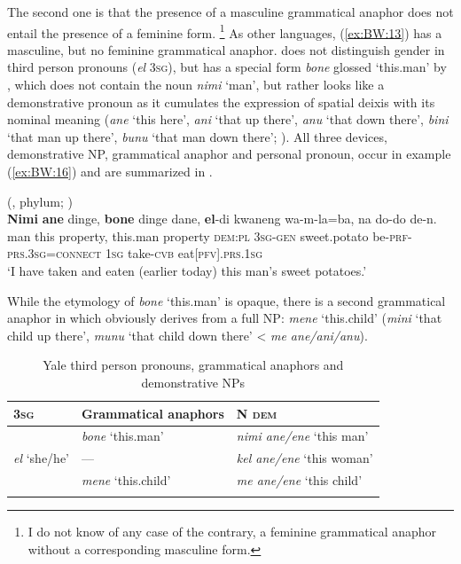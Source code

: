 \documentclass[output=collectionpaper]{langsci/langscibook}
\begin{document}
The second one is that the presence of a masculine grammatical anaphor does not entail the presence of a feminine form.%
\footnote{%
I do not know of any case of the contrary, a feminine grammatical anaphor without a corresponding masculine form.
} %
As other  languages,  (\ref{ex:BW:13}) has a masculine, but no feminine grammatical anaphor.  does not distinguish gender in third person pronouns (\textit{el} \textsc{3sg}), but has a special form \textit{bone} glossed ‘this.man’ by \citet{Heeschen1992}, which does not contain the noun \textit{nimi} ‘man’, but rather looks like a demonstrative pronoun as it cumulates the expression of spatial deixis with its nominal meaning (\textit{ane} ‘this here’, \textit{ani} ‘that up there’, \textit{anu} ‘that down there’, \textit{bini} ‘that man up there’, \textit{bunu} ‘that man down there’; \citealt[15]{Heeschen1992}). All three devices, demonstrative NP, grammatical anaphor and personal pronoun, occur in example (\ref{ex:BW:16}) and are summarized in .

\ea\label{ex:BW:16}
 (,  phylum; \citealt[29]{Heeschen1992})\\
\gll \textbf{Nimi}	\textbf{ane}	dinge,	\textbf{bone}	dinge	dane,	\textbf{el}-di	kwaneng	wa-m-la=ba, na	do-do	de-n.\\
man	this	property,	this.man	property	\textsc{dem:pl}	\textsc{3sg-gen}	sweet.potato	be-\textsc{prf-prs.3sg}=\textsc{connect} \textsc{1sg}	take-\textsc{cvb}	eat\textsc{[pfv].prs.1sg}\\
\glt ‘I have taken and eaten (earlier today) this man’s sweet potatoes.’\\
\z

While the etymology of \textit{bone} ‘this.man’ is opaque, there is a second grammatical anaphor in  which obviously derives from a full NP: \textit{mene} ‘this.child’ (\textit{mini} ‘that child up there’, \textit{munu} ‘that child down there’ < \textit{me ane/ani/anu}).

\begin{table}
\begin{tabularx}{\textwidth}{lQQ}
\lsptoprule
\scshape 3sg	&	Grammatical anaphors	&	N \scshape dem	\\
\midrule
	&	\textit{bone} ‘this.man’	&	\textit{nimi ane/ene} ‘this man’	\\
\textit{el} ‘she/he’	&	—	&	\textit{kel ane/ene} ‘this woman’	\\
	&	\textit{mene} ‘this.child’	&	\textit{me ane/ene} ‘this child’	\\
\lspbottomrule
\end{tabularx}
\caption{Yale third person pronouns, grammatical anaphors and demonstrative NPs}
\label{tab:BW:7}
\end{table}
\end{document}
